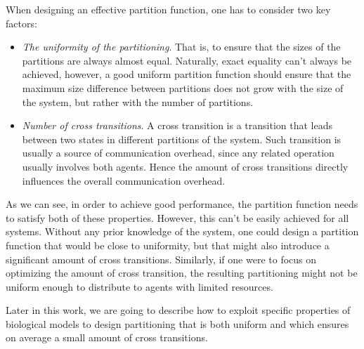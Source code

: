 When designing an effective partition function, one has to consider two key factors:
\begin{itemize}
	\item  \emph{The uniformity of the partitioning}. That is, to ensure that the sizes of the partitions are always almost equal. Naturally, exact equality can't always be achieved, however, a good uniform partition function should ensure that the maximum size difference between partitions does not grow with the size of the system, but rather with the number of partitions.
	\item \emph{Number of cross transitions}. A cross transition is a transition that leads between two states in different partitions of the system. Such transition is usually a source of communication overhead, since any related operation usually involves both agents. Hence the amount of cross transitions directly influences the overall communication overhead.
\end{itemize}

As we can see, in order to achieve good performance, the partition function needs to satisfy both of these properties. However, this can't be easily achieved for all systems. Without any prior knowledge of the system, one could design a partition function that would be close to uniformity, but that might also introduce a significant amount of cross transitions. Similarly, if one were to focus on optimizing the amount of cross transition, the resulting partitioning might not be uniform enough to distribute to agents with limited resources.

Later in this work, we are going to describe how to exploit specific properties of biological models to design partitioning that is both uniform and which ensures on average a small amount of cross transitions.